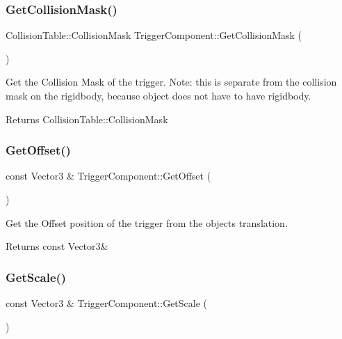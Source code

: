 \subsubsection{\texorpdfstring{Get\+Collision\+Mask()}{GetCollisionMask()}}
{\footnotesize\ttfamily Collision\+Table\+::\+Collision\+Mask Trigger\+Component\+::\+Get\+Collision\+Mask (\begin{DoxyParamCaption}{ }\end{DoxyParamCaption})}



Get the Collision Mask of the trigger. Note\+: this is separate from the collision mask on the rigidbody, because object does not have to have rigidbody. 

\begin{DoxyReturn}{Returns}
Collision\+Table\+::\+Collision\+Mask 
\end{DoxyReturn}
\mbox{\label{classTriggerComponent_a81caada870d7dd9b0cf665495dfcea99}} 
\subsubsection{\texorpdfstring{Get\+Offset()}{GetOffset()}}
{\footnotesize\ttfamily const Vector3 \& Trigger\+Component\+::\+Get\+Offset (\begin{DoxyParamCaption}{ }\end{DoxyParamCaption})}



Get the Offset position of the trigger from the objects translation. 

\begin{DoxyReturn}{Returns}
const Vector3\& 
\end{DoxyReturn}
\mbox{\label{classTriggerComponent_af2159e7d62a5dade58a8d5d390b8dbe4}} 
\subsubsection{\texorpdfstring{Get\+Scale()}{GetScale()}}
{\footnotesize\ttfamily const Vector3 \& Trigger\+Component\+::\+Get\+Scale (\begin{DoxyParamCaption}{ }\end{DoxyParamCaption})}




